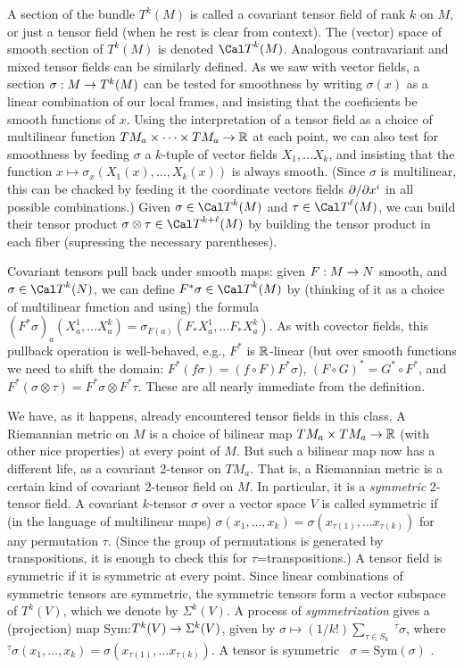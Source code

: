 A section of the bundle $T^k(M)$ is called a covariant tensor field of rank $k$
on $M$, or just a tensor field (when he rest is clear from context).
The (vector) space of smooth section of $T^k(M)$ is denoted ${\Cal T}^k(M)$.
Analogous contravariant and mixed tensor fields can be similarly 
defined. As we saw with vector fields, a section $\sigma:M\rightarrow T^k(M)$ can be
tested for smoothness by writing $\sigma(x)$ as a linear combination
of our local frames, and insisting that the coeficients be smooth
functions of $x$. Using the interpretation of a tensor field as a choice of multilinear
function $TM_a\times \cdots \times TM_a\rightarrow {\Bbb R}$ at each point, we can also 
test for smoothness by feeding $\sigma$ a $k$-tuple of vector fields $X_1,\ldots X_k$,
and insisting that the function $x\mapsto \sigma_x(X_1(x),\ldots ,X_k(x))$ is always smooth.
(Since $\sigma$ is multilinear, this can be chacked by feeding it the coordinate
vectors fields $\partial/\partial x^i$ in all possible combinations.) Given 
$\sigma\in {\Cal T}^k(M)$ and $\tau\in {\Cal T}^\ell(M)$, we can build
their tensor product $\sigma\otimes\tau\in {\Cal T}^{k+\ell}(M)$ by building 
the tensor product in each fiber (supressing the necessary parentheses).

\msk

Covariant tensors pull back under smooth maps: given $F:M\rightarrow N$ smooth, and 
$\sigma\in {\Cal T}^k(N)$, we can define $F^*\sigma\in\calt^k(M)$ by
(thinking of it as a choice of multilinear function and using) the formula
$(F^*\sigma)_a(X^1_a,\ldots X^k_a)=\sigma_{F(a)}(F_*X^1_a,\ldots F_*X^k_a)$.
As with covector fields, this pullback operation is well-behaved, e.g., 
$F^*$ is ${\Bbb R}$-linear (but over smooth functions we need to shift the 
domain: $F^*(f\sigma)=(f\circ F)F^*\sigma$),
$(F\circ G)^*=G^*\circ F^*$, and $F^*(\sigma\otimes\tau)=F^*\sigma\otimes F^*\tau$.
These are all nearly immediate from the definition.

\msk

We have, as it happens, already encountered tensor fields in this class. A
Riemannian metric on $M$ is a choice of bilinear map $TM_a\times TM_a\rightarrow {\Bbb R}$
(with other nice properties) at every point of $M$. But such a bilinear map
now has a different life, as a covariant 2-tensor on $TM_a$. That is, a
Riemannian metric is a certain kind of covariant 2-tensor field on $M$.
In particular, it is a {\it symmetric} 2-tensor field. A covariant 
$k$-tensor $\sigma$ over a vector space $V$ is called symmetric if 
(in the language of multilinear maps)
$\sigma(x_1,\ldots ,x_k)=\sigma(x_{\tau(1)},\ldots x_{\tau(k)})$ for any permutation
$\tau$. (Since the group of permutations is generated by transpositions,
it is enough to check this for $\tau$=transpositions.) A tensor field is symmetric 
if it is symmetric at every point. Since linear combinations of symmetric
tensors are symmetric, the symmetric tensors form a vector subspace of $T^k(V)$,
which we denote by $\Sigma^k(V)$. A process of {\it symmetrization} gives a 
(projection) map Sym:$T^k(V)\rightarrow \Sigma^k(V)$, given by 
$\sigma\mapsto (1/k!)\sum_{\tau\in S_k}\ ^\tau\sigma$, where 
$^\tau\sigma(x_1,\ldots ,x_k)=\sigma(x_{\tau(1)},\ldots x_{\tau(k)})$.
A tensor is symmetric \lra\ $\sigma=$Sym$(\sigma)$ .


